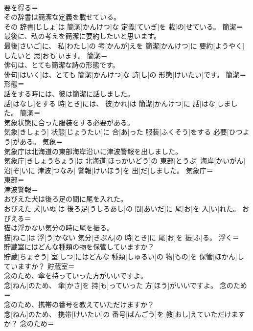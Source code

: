 \documentclass[8pt]{extreport}
\begin{document}
\begin{CJK}{UTF8}{min}
\\	要を得る＝ 
\\	その辞書は簡潔な定義を載せている。	
\\	その 辞書[じしょ]は 簡潔[かんけつ]な 定義[ていぎ]を 載[の]せている。	簡潔＝ 
\\	最後に、私の考えを簡潔に要約したいと思います。	
\\	最後[さいご]に、 私[わたし]の 考[かんが]えを 簡潔[かんけつ]に 要約[ようやく]したいと 思[おも]います。	簡潔＝ 
\\	俳句は、とても簡潔な詩の形態です。	
\\	俳句[はいく]は、とても 簡潔[かんけつ]な 詩[し]の 形態[けいたい]です。	簡潔＝ 
\\	形態＝ 
\\	話をする時には、彼は簡潔に話しました。	
\\	話[はなし]をする 時[とき]には、 彼[かれ]は 簡潔[かんけつ]に 話[はな]しました。	簡潔＝ 
\\	気象状態に合った服装をする必要がある。	
\\	気象[きしょう] 状態[じょうたい]に 合[あ]った 服装[ふくそう]をする 必要[ひつよう]がある。	気象＝ 
\\	気象庁は北海道の東部海岸沿いに津波警報を出しました。	
\\	気象庁[きしょうちょう]は 北海道[ほっかいどう]の 東部[とうぶ] 海岸[かいがん] 沿[ぞ]いに 津波[つなみ] 警報[けいほう]を 出[だ]しました。	気象庁＝ 
\\	東部＝ 
\\	津波警報＝ 
\\	おびえた犬は後ろ足の間に尾を入れた。	
\\	おびえた 犬[いぬ]は 後ろ足[うしろあし]の 間[あいだ]に 尾[お]を 入[い]れた。	おびえる＝ 
\\	猫は浮かない気分の時に尾を振る。	
\\	猫[ねこ]は 浮[う]かない 気分[きぶん]の 時[とき]に 尾[お]を 振[ふ]る。	浮く＝ 
\\	貯蔵室にはどんな種類の物を保管していますか？	
\\	貯蔵[ちょぞう] 室[しつ]にはどんな 種類[しゅるい]の 物[もの]を 保管[ほかん]していますか？	貯蔵室＝ 
\\	念のため、傘を持っていった方がいいですよ。	
\\	念[ねん]のため、 傘[かさ]を 持[も]っていった 方[ほう]がいいですよ。	念のため＝ 
\\	念のため、携帯の番号を教えていただけますか？	
\\	念[ねん]のため、 携帯[けいたい]の 番号[ばんごう]を 教[おし]えていただけますか？	念のため＝ 

\end{CJK}
\end{document}
